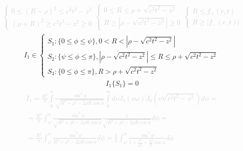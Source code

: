 %
\textcolor{lightgray}{ \begin{equation*} \begin{aligned}
\begin{cases}
0 \leq \left( R - \rho \right)^2 \leq c^2 t^2 - z^2 \\ 
\left( \rho + R \right)^2 \geq c^2 t^2 - z^2 \geq 0
\end{cases}
\begin{cases}
0 \leq R \leq \rho + \sqrt{c^2 t^2 - z^2} \\
R \geq \left| \rho - \sqrt{c^2 t^2 - z^2} \right| \geq 0
\end{cases}
\begin{cases}
R \leq f_+(r,t) \\
R \geq \left| f_-(r,t) \right|
\end{cases} 
\end{aligned} \end{equation*} }
%
\begin{equation*} \begin{aligned}
I_1 \in \begin{cases}
S_1: \{ 0 \leq \phi \leq \psi \}, 0 < R < 
\left| \rho - \sqrt{c^2 t^2 - z^2} \right| \\
S_2: \{ \psi \leq \phi \leq \pi \}, \left| \rho - \sqrt{c^2 t^2 - z^2} \right| \leq 
R \leq \rho + \sqrt{c^2 t^2 - z^2} \\
S_3: \{ 0 \leq \phi \leq \pi \}, R > \rho + \sqrt{c^2 t^2 - z^2}
\end{cases} 
\end{aligned} \end{equation*}
%
\begin{equation*} \begin{aligned}
I_1 \{ S_1 \} = 0
\end{aligned} \end{equation*}
%
\textcolor{lightgray}{ \begin{equation*} \begin{aligned}
I_1 = \frac{R^2}{\pi} \int\limits_{0}^{\pi} 
\frac{\sin^2{\phi}}{\sqrt{R^2 + \rho^2 - 2 \rho R \cos \phi}}
\int\limits_{0}^{\infty} d \nu J_1 \left( \nu \omega \right) 
J_0 \left( \nu \sqrt{c^2 t^2 - z^2} \right) d \phi = \\
= \frac{R^2}{\pi} \int_{\psi}^{\pi}
\frac{\sin^2{\phi}}{\sqrt{R^2 + \rho^2 - 2 \rho R \cos \phi}}
\frac{1}{\sqrt{R^2 + \rho^2 - 2 \rho R \cos \phi}} d \phi = \\
= \frac{R^2}{\pi} \int_{\psi}^{\pi}
\frac{\sin^2{\phi}}{R^2 + \rho^2 - 2 \rho R \cos \phi} d \phi = 
\frac{1}{\pi} \int_{\psi}^{\pi}
\frac{\sin^2{\phi}}{1 + \frac{\rho^2}{R^2} - \frac{2 \rho}{R} \cos \phi} d \phi
\end{aligned} \end{equation*} }

